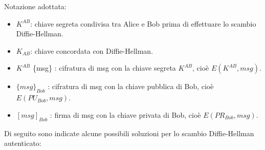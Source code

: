 Notazione adottata: \begin{itemize}
\item $K^{AB}$: chiave segreta condivisa tra Alice e Bob prima di effettuare lo scambio Diffie-Hellman.
\item $K_{AB}$: chiave concordata con Diffie-Hellman.
\item $K^{AB}$ \{msg\} : cifratura di msg con la chiave segreta $K^{AB}$, cioè $E(K^{AB}, msg)$.
\item $\{msg\}_{Bob}$ : cifratura di msg con la chiave pubblica di Bob, cioè $E(PU_{Bob}, msg)$.
\item $[msg]_{Bob}$ : firma di msg con la chiave privata di Bob, cioè
$E(PR_{Bob}, msg)$.
\end{itemize}
Di seguito sono indicate alcune possibili soluzioni per lo scambio Diffie-Hellman autenticato:
